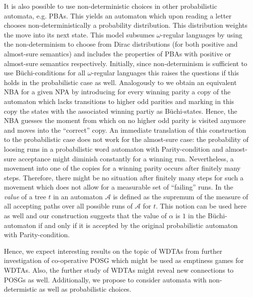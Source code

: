 It is also possible to use non-deterministic choices in other probabilistic
automata, e.g. \acp{PBA}. This yields an automaton which upon reading a
letter chooses non-deterministically a probability distribution. This
distribution weights the move into its next state. This model subsumes
$\omega$-regular languages by using the non-determinism to choose from Dirac
distributions (for both positive and almost-sure semantics) and includes the
properties of \acp{PBA} with positive or almost-sure semantics respectively.
Initially, since non-determinism is sufficient to use Büchi-conditions for all
$\omega$-regular languages this raises the questions if this holds in the
probabilistic case as well. Analogously to \cite[Theorem 1.10]{AutoLogInfGames}
we obtain an equivalent \ac{NBA} for a given \ac{NPA} by introducing for every
winning parity a copy of the automaton which lacks transitions to higher odd
parities and marking in this copy the states with the associated winning partiy
as Büchi-states. Hence, the \ac{NBA} guesses the moment from which on no higher
odd parity is visited anymore and moves into the \enquote{correct} copy. An
immediate translation of this construction to the probabilistic case does not
work for the almost-sure case: the probability of loosing runs in a
probabilistic word automaton with Parity-condition and almost-sure acceptance
might diminish constantly for a winning run. Nevertheless, a movement into one
of the copies for a winning parity occurs after finitely many steps. Therefore,
there might be no situation after finitely many steps for such a movement which
does not allow for a measurable set of \enquote{failing} runs. In
\cite{RandAutoInfTrees} the \emph{value} of a tree $t$ in an automaton
$\mathcal{A}$ is defined as the supremum of the measure of all accepting paths
over all possible runs of $\mathcal{A}$ for $t$. This notion can be used here
as well and our construction suggests that the value of $\alpha$ is $1$ in the
Büchi-automaton if and only if it is accepted by the original probabilistic
automaton with Parity-condition.

Hence, we expect interesting results on the topic of \acp{WDTA} from
further investigation of co-operative \ac{POSG} which might be used as
emptiness games for \acp{WDTA}. Also, the further study of \acp{WDTA} might
reveal new connections to \acp{POSG} as well. Additionally, we propose to
consider automata with non-determistic as well as probabilistic choices.

